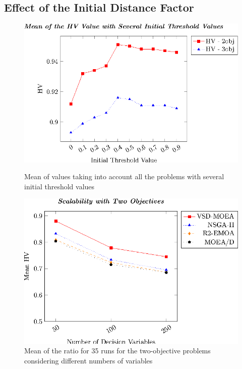 





\subsection{Effect of the Initial Distance Factor}

\begin{figure}[t]
\centering
\includegraphics[scale=0.85]{images/Graphic-Initial-Distance_tikz-figure0.eps} \\
\caption{Mean of \HV{} values taking into account all the problems with several initial threshold values}\label{fig:Initial-distance-factor}
\end{figure}



\begin{figure}[t]
\centering
\includegraphics[scale=0.85]{images/Graphic-Scalability-2obj_tikz-figure0.eps}
\caption{Mean of the \HV{} ratio for 35 runs for the two-objective problems considering different numbers of variables}\label{fig:variable-decision-scalability-2obj}
\end{figure}

